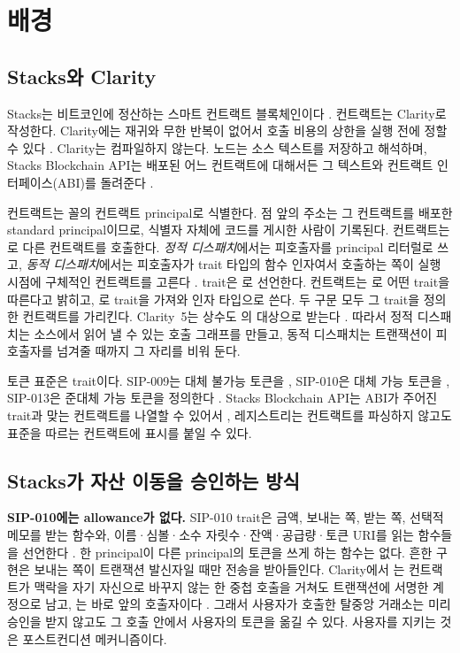 \section{배경}
\label{sec:background}

\subsection{Stacks와 Clarity}
\label{sec:bg-clarity}

Stacks는 비트코인에 정산하는 스마트 컨트랙트 블록체인이다 \cite{ali2021stacks}. 컨트랙트는 Clarity로 작성한다. Clarity에는 재귀와 무한 반복이 없어서 호출 비용의 상한을 실행 전에 정할 수 있다 \cite{sip002}. Clarity는 컴파일하지 않는다. 노드는 소스 텍스트를 저장하고 해석하며, Stacks Blockchain API는 배포된 어느 컨트랙트에 대해서든 그 텍스트와 컨트랙트 인터페이스(ABI)를 돌려준다 \cite{hiroapi}.

컨트랙트는  꼴의 컨트랙트 principal로 식별한다. 점 앞의 주소는 그 컨트랙트를 배포한 standard principal이므로, 식별자 자체에 코드를 게시한 사람이 기록된다. 컨트랙트는 로 다른 컨트랙트를 호출한다. \emph{정적 디스패치}에서는 피호출자를 principal 리터럴로 쓰고, \emph{동적 디스패치}에서는 피호출자가 trait 타입의 함수 인자여서 호출하는 쪽이 실행 시점에 구체적인 컨트랙트를 고른다 \cite{sip002}. trait은 로 선언한다. 컨트랙트는 로 어떤 trait을 따른다고 밝히고, 로 trait을 가져와 인자 타입으로 쓴다. 두 구문 모두 그 trait을 정의한 컨트랙트를 가리킨다. Clarity~5는 상수도 의 대상으로 받는다 \cite{sip039}. 따라서 정적 디스패치는 소스에서 읽어 낼 수 있는 호출 그래프를 만들고, 동적 디스패치는 트랜잭션이 피호출자를 넘겨줄 때까지 그 자리를 비워 둔다.

토큰 표준은 trait이다. SIP-009는 대체 불가능 토큰을 \cite{sip009}, SIP-010은 대체 가능 토큰을 \cite{sip010}, SIP-013은 준대체 가능 토큰을 정의한다 \cite{sip013}. Stacks Blockchain API는 ABI가 주어진 trait과 맞는 컨트랙트를 나열할 수 있어서 \cite{hiroapi}, 레지스트리는 컨트랙트를 파싱하지 않고도 표준을 따르는 컨트랙트에 표시를 붙일 수 있다.

\subsection{Stacks가 자산 이동을 승인하는 방식}
\label{sec:bg-authorization}

\textbf{SIP-010에는 allowance가 없다.} SIP-010 trait은 금액, 보내는 쪽, 받는 쪽, 선택적 메모를 받는  함수와, 이름·심볼·소수 자릿수·잔액·공급량·토큰 URI를 읽는 함수들을 선언한다 \cite{sip010}. 한 principal이 다른 principal의 토큰을 쓰게 하는 함수는 없다. 흔한 구현은 보내는 쪽이 트랜잭션 발신자일 때만 전송을 받아들인다. Clarity에서 는 컨트랙트가 맥락을 자기 자신으로 바꾸지 않는 한 중첩 호출을 거쳐도 트랜잭션에 서명한 계정으로 남고, 는 바로 앞의 호출자이다 \cite{sip002}. 그래서 사용자가 호출한 탈중앙 거래소는 미리 승인을 받지 않고도 그 호출 안에서 사용자의 토큰을 옮길 수 있다. 사용자를 지키는 것은 포스트컨디션 메커니즘이다.

